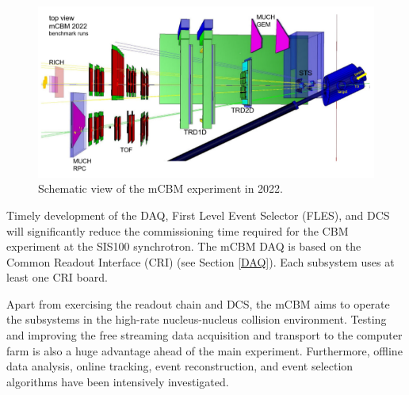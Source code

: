 \begin{figure}[!h]
\centering
\includegraphics[width=1\columnwidth]{Chapter6/DCS/images/mcbm_2021_setup.png}
\caption{Schematic view of the mCBM experiment in 2022.}
\label{fig_mcbm}
\end{figure}
\newpage
Timely development of the \gls{DAQ}, First Level Event Selector (\gls{FLES}), and \gls{DCS} will significantly reduce the commissioning time required for the \gls{CBM} experiment at the SIS100 synchrotron. The \gls{mCBM} \gls{DAQ} is based on the Common Readout Interface (\gls{CRI}) (see Section \ref{DAQ}). Each subsystem uses at least one \gls{CRI} board. 

Apart from exercising the readout chain and \gls{DCS}, the \gls{mCBM} aims to operate the subsystems in the high-rate nucleus-nucleus collision environment. Testing and improving the free streaming data acquisition and transport to the computer farm is also a huge advantage ahead of the main experiment. Furthermore, offline data analysis, online tracking, event reconstruction, and event selection algorithms have been intensively investigated. 


